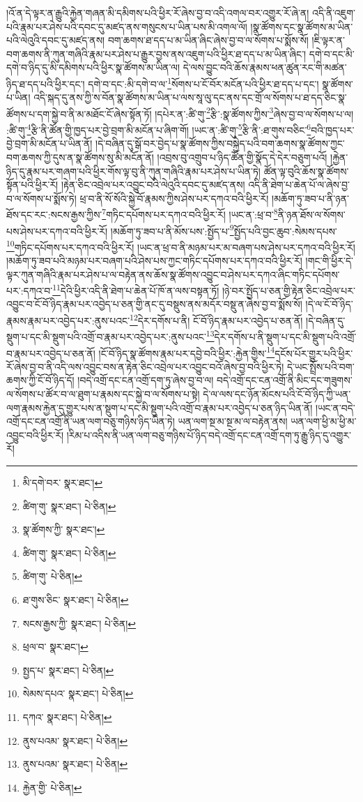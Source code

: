 །འོ་ན་དེ་ལྟར་ན་རྒྱུའི་རྐྱེན་གཞན་མི་དམིགས་པའི་ཕྱིར་རོ་ཞེས་བྱ་བ་འདི་འགལ་བར་འགྱུར་རོ་ཞེ་ན། འདི་ནི་འཇུག་པའི་རྣམ་པར་ཤེས་པའི་དབང་དུ་མཛད་ནས་གསུངས་པ་ཡིན་པས་མི་འགལ་ལོ། །སྣ་ཚོགས་དང་སྣ་ཚོགས་མ་ཡིན་པའི་ལེའུའི་དབང་དུ་མཛད་ནས། བག་ཆགས་ཐ་དད་པ་མ་ཡིན་ཞིང་ཞེས་བྱ་བ་ལ་སོགས་པ་སྨོས་སོ། །ཇི་ལྟར་ན་བག་ཆགས་ནི་ཀུན་གཞིའི་རྣམ་པར་ཤེས་པ་རྒྱུར་བྱས་ནས་འཇུག་པའི་ཕྱིར་ཐ་དད་པ་མ་ཡིན་ཞིང་། དགེ་བ་དང་མི་དགེ་བ་ཉིད་དུ་མི་དམིགས་པའི་ཕྱིར་སྣ་ཚོགས་མ་ཡིན་ལ། དེ་ལས་བྱུང་བའི་ཆོས་རྣམས་ཕན་ཚུན་རང་གི་མཚན་ཉིད་ཐ་དད་པའི་ཕྱིར་དང་། དགེ་བ་དང་:མི་དགེ་བ་ལ་\footnote{མི་དགེ་བར་  སྣར་ཐང་། }སོགས་པ་ངོ་བོར་མངོན་པའི་ཕྱིར་ཐ་དད་པ་དང་། སྣ་ཚོགས་པ་ཡིན། འདི་སྐད་དུ་ནས་ཀྱི་ས་བོན་སྣ་ཚོགས་མ་ཡིན་པ་ལས་སཱ་ལུ་དང་ནས་དང་གྲོ་ལ་སོགས་པ་ཐ་དད་ཅིང་སྣ་ཚོགས་པ་དག་སྐྱེ་བ་ནི་མ་མཐོང་ངོ་ཞེས་སྟོན་ཏོ། །དཔེར་ན་:ཚི་གུ་\footnote{ཚིག་གུ་  སྣར་ཐང་།  པེ་ཅིན། }རྩི་:སྣ་ཚོགས་ཀྱིས་\footnote{སྣ་ཚོགས་ཀྱི་  སྣར་ཐང་། }ཞེས་བྱ་བ་ལ་སོགས་པ་ལ། :ཚི་གུ་\footnote{ཚིག་གུ་  སྣར་ཐང་།  པེ་ཅིན། }རྩི་ནི་ཚོན་གྱི་ཁྱད་པར་བྱེ་བྲག་མི་མངོན་པ་ཞིག་གོ། །ཡང་ན་:ཚི་གུ་\footnote{ཚིག་གུ་  པེ་ཅིན། }རྩི་ནི་:ཐ་གུས་བཅིང་\footnote{ཐ་གུས་ཅིང་  སྣར་ཐང་།  པེ་ཅིན། }བའི་ཁྱད་པར་བྱེ་བྲག་མི་མངོན་པ་ཡིན་ནོ། །དེ་བཞིན་དུ་སྒོ་བར་བྱེད་པ་སྣ་ཚོགས་ཀྱིས་བསྐྱེད་པའི་བག་ཆགས་སྣ་ཚོགས་ཀྱང་བག་ཆགས་ཀྱི་དུས་ན་སྣ་ཚོགས་སུ་མི་མངོན་ནོ། །འབྲས་བུ་འགྲུབ་པ་ཉིད་ཚོན་གྱི་སྣོད་དེ་དེར་བཅུག་པའོ། །རྐྱེན་ཉིད་དུ་རྣམ་པར་གཞག་པའི་ཕྱིར་གོས་ལྟ་བུ་ནི་ཀུན་གཞིའི་རྣམ་པར་ཤེས་པ་ཡིན་ཏེ། ཚོན་ལྟ་བུའི་ཆོས་སྣ་ཚོགས་སྟོན་པའི་ཕྱིར་རོ། །རྟེན་ཅིང་འབྲེལ་པར་འབྱུང་བའི་ལེའུའི་དབང་དུ་མཛད་ནས། འདི་ནི་ཐེག་པ་ཆེན་པོ་ལ་ཞེས་བྱ་བ་ལ་སོགས་པ་སྨོས་ཏེ། ཕྲ་བ་ནི་སོ་སོའི་སྐྱེ་བོ་རྣམས་ཀྱིས་ཤེས་པར་དཀའ་བའི་ཕྱིར་རོ། །མཆོག་ཏུ་ཟབ་པ་ནི་ཉན་ཐོས་དང་རང་:སངས་རྒྱས་ཀྱིས་\footnote{སངས་རྒྱས་ཀྱི་  སྣར་ཐང་།  པེ་ཅིན། }གཏིང་དཔོགས་པར་དཀའ་བའི་ཕྱིར་རོ། །ཡང་ན་:ཕྲ་བ་\footnote{ཕྲལ་བ་  སྣར་ཐང་། }ནི་ཉན་ཐོས་ལ་སོགས་པས་ཤེས་པར་དཀའ་བའི་ཕྱིར་རོ། །མཆོག་ཏུ་ཟབ་པ་ནི་མོས་པས་:སྤྱོད་པ་\footnote{སྤྱད་པ་  སྣར་ཐང་།  པེ་ཅིན། }སྤྱོད་པའི་བྱང་ཆུབ་:སེམས་དཔས་\footnote{སེམས་དཔའ་  སྣར་ཐང་།  པེ་ཅིན། }གཏིང་དཔོགས་པར་དཀའ་བའི་ཕྱིར་རོ། །ཡང་ན་ཕྲ་བ་ནི་མཉམ་པར་མ་བཞག་པས་ཤེས་པར་དཀའ་བའི་ཕྱིར་རོ། །མཆོག་ཏུ་ཟབ་པའི་མཉམ་པར་བཞག་པའི་ཤེས་པས་ཀྱང་གཏིང་དཔོགས་པར་དཀའ་བའི་ཕྱིར་རོ། །གང་གི་ཕྱིར་དེ་ལྟར་ཀུན་གཞིའི་རྣམ་པར་ཤེས་པ་ལ་བརྟེན་ནས་ཆོས་སྣ་ཚོགས་འབྱུང་བ་ཤེས་པར་དཀའ་ཞིང་གཏིང་དཔོགས་པར་:དཀའ་བ་\footnote{དཀའ་  སྣར་ཐང་།  པེ་ཅིན། }དེའི་ཕྱིར་འདི་ནི་ཐེག་པ་ཆེན་པོ་ཁོ་ན་ལས་བསྟན་ཏོ། །ཉེ་བར་སྤྱོད་པ་ཅན་གྱི་རྟེན་ཅིང་འབྲེལ་པར་འབྱུང་བ་ངོ་བོ་ཉིད་རྣམ་པར་འབྱེད་པ་ཅན་གྱི་ནང་དུ་བསྡུས་ནས་མདོར་བསྡུ་ན་ཞེས་བྱ་བ་སྨོས་སོ། །དེ་ལ་ངོ་བོ་ཉིད་རྣམས་རྣམ་པར་འབྱེད་པར་:ནུས་པའང་\footnote{ནུས་པའམ་  སྣར་ཐང་།  པེ་ཅིན། }དེར་དགོས་པ་ནི། ངོ་བོ་ཉིད་རྣམ་པར་འབྱེད་པ་ཅན་ནོ། །དེ་བཞིན་དུ་སྡུག་པ་དང་མི་སྡུག་པའི་འགྲོ་བ་རྣམ་པར་འབྱེད་པར་:ནུས་པའང་\footnote{ནུས་པའམ་  སྣར་ཐང་།  པེ་ཅིན། }དེར་དགོས་པ་ནི་སྡུག་པ་དང་མི་སྡུག་པའི་འགྲོ་བ་རྣམ་པར་འབྱེད་པ་ཅན་ནོ། །ངོ་བོ་ཉིད་སྣ་ཚོགས་རྣམ་པར་དབྱེ་བའི་ཕྱིར་:རྐྱེན་གྱིས་\footnote{རྐྱེན་གྱི་  པེ་ཅིན། }དངོས་པོར་གྱུར་པའི་ཕྱིར་རོ་ཞེས་བྱ་བ་ནི་འདི་ལས་འབྱུང་བས་ན་རྟེན་ཅིང་འབྲེལ་པར་འབྱུང་བའོ་ཞེས་བྱ་བའི་ཕྱིར་ཏེ། དེ་ཡང་སྤྲོས་པའི་བག་ཆགས་ཀྱི་ངོ་བོ་ཉིད་དོ། །བདེ་འགྲོ་དང་ངན་འགྲོ་དག་ཏུ་ཞེས་བྱ་བ་ལ། བདེ་འགྲོ་དང་ངན་འགྲོ་ནི་མིང་དང་གཟུགས་ལ་སོགས་པ་ཚོར་བ་ལ་ཐུག་པ་རྣམས་དང་སྐྱེ་བ་ལ་སོགས་པ་སྟེ། དེ་ལ་ལས་དང་ཉོན་མོངས་པའི་ངོ་བོ་ཉིད་ཀྱི་ཡན་ལག་རྣམས་རྐྱེན་དུ་གྱུར་པས་ན་སྡུག་པ་དང་མི་སྡུག་པའི་འགྲོ་བ་རྣམ་པར་འབྱེད་པ་ཅན་ཉིད་ཡིན་ནོ། །ཡང་ན་བདེ་འགྲོ་དང་ངན་འགྲོ་ནི་ཡན་ལག་བཅུ་གཉིས་ཉིད་ཡིན་ཏེ། ཡན་ལག་སྔ་མ་སྔ་མ་ལ་བརྟེན་ནས། ཡན་ལག་ཕྱི་མ་ཕྱི་མ་འབྱུང་བའི་ཕྱིར་རོ། །རིམ་པ་འདིས་ནི་ཡན་ལག་བཅུ་གཉིས་པོ་ཉིད་བདེ་འགྲོ་དང་ངན་འགྲོ་དག་ཏུ་རྒྱུ་ཉིད་དུ་འགྱུར་རོ། 